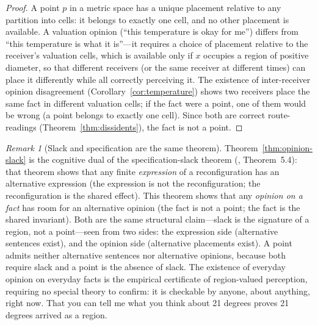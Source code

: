 \documentclass[twocolumn,11pt,a4paper]{article}
\theoremstyle{adv}
\theoremstyle{definition}
\theoremstyle{remark}
\newtheorem{remark}[theorem]{Remark}
\begin{document}
\begin{proof}
A point $p$ in a metric space has a unique placement relative to any
partition into cells: it belongs to exactly one cell, and no other placement
is available. A valuation opinion (``this temperature is okay for me'')
differs from ``this temperature is what it is''---it requires a choice of
placement relative to the receiver's valuation cells, which is available
only if $x$ occupies a region of positive diameter, so that different
receivers (or the same receiver at different times) can place it differently
while all correctly perceiving it. The existence of inter-receiver opinion
disagreement (Corollary~\ref{cor:temperature}) shows two receivers place the
same fact in different valuation cells; if the fact were a point, one of
them would be wrong (a point belongs to exactly one cell). Since both are
correct route-readings (Theorem~\ref{thm:dissidents}), the fact is not a
point.
\end{proof}

\begin{remark}[Slack and specification are the same theorem]
Theorem~\ref{thm:opinion-slack} is the cognitive dual of the specification-slack
theorem (\citealt{sachikonye2025knowledge}, Theorem~5.4): that theorem shows
that any finite \emph{expression} of a reconfiguration has an alternative
expression (the expression is not the reconfiguration; the reconfiguration is
the shared effect). This theorem shows that any \emph{opinion on a fact} has
room for an alternative opinion (the fact is not a point; the fact is the
shared invariant). Both are the same structural claim---slack is the signature
of a region, not a point---seen from two sides: the expression side
(alternative sentences exist), and the opinion side (alternative placements
exist). A point admits neither alternative sentences nor alternative
opinions, because both require slack and a point is the absence of slack.
The existence of everyday opinion on everyday facts is the empirical
certificate of region-valued perception, requiring no special theory to
confirm: it is checkable by anyone, about anything, right now. That you can
tell me what you think about 21 degrees proves 21 degrees arrived as a
region.
\end{remark}
\end{document}

